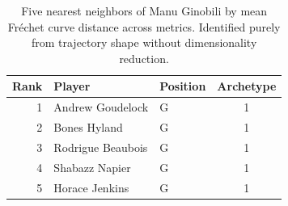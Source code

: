 \begin{table}[htbp]
  \centering\small
  \begin{tabular}{rllc}
    \toprule
    Rank & Player & Position & Archetype \\
    \midrule
    1 & Andrew Goudelock & G & 1 \\
    2 & Bones Hyland & G & 1 \\
    3 & Rodrigue Beaubois & G & 1 \\
    4 & Shabazz Napier & G & 1 \\
    5 & Horace Jenkins & G & 1 \\
    \bottomrule
  \end{tabular}
  \caption{Five nearest neighbors of Manu Ginobili by mean Fr\'{e}chet curve distance across metrics. Identified purely from trajectory shape without dimensionality reduction.}
  \label{tab:Manu_Ginobili_frechet_curve_neighbors}
\end{table}

